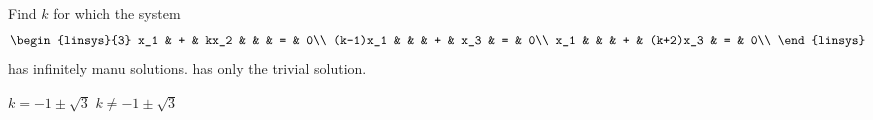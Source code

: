 
\begin{Exercise}[name={},
title={}, 
origin={\cite{OV}},
counter=Exercise]
Find $k$ for which the system
\[
\begin{linsys}{3}
x_1 & + & kx_2 & & & = & 0\\
(k-1)x_1 & & & + & x_3 & = & 0\\
x_1 &  & & + & (k+2)x_3 & = & 0\\
\end{linsys}
\]
\Question has infinitely manu solutions.
\Question has only the trivial solution.
\end{Exercise}

\begin{Answer}
\Question $k=-1\pm\sqrt{3}$
\Question $k\neq-1\pm\sqrt{3}$
\end{Answer}

